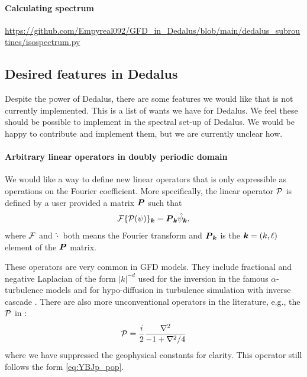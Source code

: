\paragraph{Calculating spectrum}
\url{https://github.com/Empyreal092/GFD_in_Dedalus/blob/main/dedalus_subroutines/isospectrum.py}

\subsection{Desired features in Dedalus}
Despite the power of Dedalus, there are some features we would like that is not currently implemented. This is a list of wants we have for Dedalus. We feel these should be possible to implement in the spectral set-up of Dedalus. We would be happy to contribute and implement them, but we are currently unclear how.

\paragraph{Arbitrary linear operators in doubly periodic domain}\label{sec:ded_want_linop}
We would like a way to define new linear operators that is only expressible as operations on the Fourier coefficient. More specifically, the linear operator $\mathcal{P}$ is defined by a user provided a matrix $\boldsymbol{P}$ such that
\begin{align}
    \mathcal{F}\{\mathcal{P}(\psi)\}_{\boldsymbol{k}} = \boldsymbol{P}_{\boldsymbol{k}}\hat\psi_{\boldsymbol{k}}.
\end{align}
where $\cal{F}$ and $\hat{\cdot}$ both means the Fourier transform and $\boldsymbol{P}_{\boldsymbol{k}}$ is the $\boldsymbol{k}=(k,\ell)$ element of the $\boldsymbol{P}$ matrix.

These operators are very common in GFD models. They include fractional and negative Laplacian of the form $|k|^{-d}$ used for the inversion in the famous $\alpha$-turbulence models \parencite{PierrehumbertEtAl_94,SmithEtAl_02} and for hypo-diffusion in turbulence simulation with inverse cascade \parencite{MajdaEtAl_97,VallgrenLindborg_11,CalliesEtAl_16}. There are also more unconventional operators in the literature, e.g., the $\mathcal{P}$ in \cite[(3.2)]{Xie_20}:
\begin{align}
    \mathcal{P} = \frac{i}{2}\frac{\nabla^2}{-1+\nabla^2/4}\label{eq:YBJp_pop}
\end{align}
where we have suppressed the geophysical constants for clarity. This operator still follows the form \eqref{eq:YBJp_pop}.

